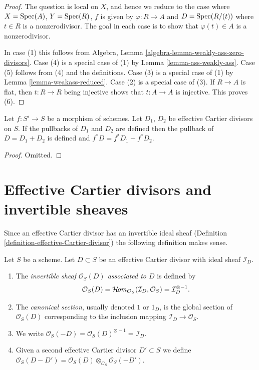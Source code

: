 \begin{proof}
The question is local on $X$, and hence we reduce to the case
where $X = \mathop{\mathrm{Spec}}(A)$, $Y = \mathop{\mathrm{Spec}}(R)$, $f$ is
given by $\varphi : R \to A$ and
$D = \mathop{\mathrm{Spec}}(R/(t))$ where $t \in R$ is a nonzerodivisor.
The goal in each case is to show that $\varphi(t) \in A$
is a nonzerodivisor.

\medskip\noindent
In case (1) this follows from
Algebra, Lemma \ref{algebra-lemma-weakly-ass-zero-divisors}.
Case (4) is a special case of (1) by Lemma \ref{lemma-ass-weakly-ass}.
Case (5) follows from (4) and the definitions.
Case (3) is a special case of (1) by
Lemma \ref{lemma-weakass-reduced}.
Case (2) is a special case of (3).
If $R \to A$ is flat, then $t : R \to R$ being injective
shows that $t : A \to A$ is injective. This proves (6).
\end{proof}

\begin{lemma}
\label{lemma-pullback-effective-Cartier-divisors-additive}
Let $f : S' \to S$ be a morphism of schemes.
Let $D_1$, $D_2$ be effective Cartier divisors on $S$.
If the pullbacks of $D_1$ and $D_2$ are defined then the
pullback of $D = D_1 + D_2$ is defined and
$f^*D = f^*D_1 + f^*D_2$.
\end{lemma}

\begin{proof}
Omitted.
\end{proof}





\section{Effective Cartier divisors and invertible sheaves}
\label{section-effective-Cartier-invertible}

\noindent
Since an effective Cartier divisor has an invertible ideal sheaf
(Definition \ref{definition-effective-Cartier-divisor}) the
following definition makes sense.

\begin{definition}
\label{definition-invertible-sheaf-effective-Cartier-divisor}
Let $S$ be a scheme. Let $D \subset S$ be an effective Cartier divisor
with ideal sheaf $\mathcal{I}_D$.
\begin{enumerate}
\item The {\it invertible sheaf $\mathcal{O}_S(D)$ associated to $D$}
is defined by
$$
\mathcal{O}_S(D) =
\mathop{\mathcal{H}\!\mathit{om}}\nolimits_{\mathcal{O}_S}(\mathcal{I}_D, \mathcal{O}_S) =
\mathcal{I}_D^{\otimes -1}.
$$
\item The {\it canonical section}, usually denoted $1$ or $1_D$, is the
global section of $\mathcal{O}_S(D)$ corresponding to
the inclusion mapping $\mathcal{I}_D \to \mathcal{O}_S$.
\item We write
$\mathcal{O}_S(-D) = \mathcal{O}_S(D)^{\otimes -1} = \mathcal{I}_D$.
\item Given a second effective Cartier divisor $D' \subset S$ we define
$\mathcal{O}_S(D - D') =
\mathcal{O}_S(D) \otimes_{\mathcal{O}_S} \mathcal{O}_S(-D')$.
\end{enumerate}
\end{definition}


